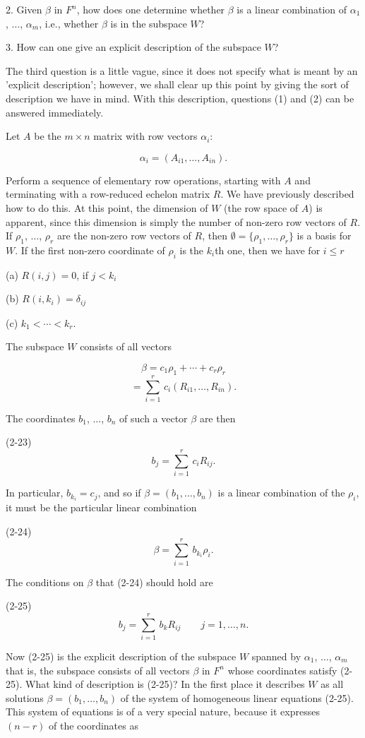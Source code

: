 2. Given \(\beta\) in \(F^{n}\), how does one determine whether \(\beta\) is a linear combination of \(\alpha_{1}\), \(\ldots\), \(\alpha_{m}\), i.e., whether \(\beta\) is in the subspace \(W\)?

3. How can one give an explicit description of the subspace \(W\)?

The third question is a little vague, since it does not specify what is meant by an 'explicit description'; however, we shall clear up this point by giving the sort of description we have in mind. With this description, questions (1) and (2) can be answered immediately.

Let \(A\) be the \(m\times n\) matrix with row vectors \(\alpha_{i}\):

\[\alpha_{i}=(A_{i1},\ldots,A_{in}).\]

Perform a sequence of elementary row operations, starting with \(A\) and terminating with a row-reduced echelon matrix \(R\). We have previously described how to do this. At this point, the dimension of \(W\) (the row space of \(A\)) is apparent, since this dimension is simply the number of non-zero row vectors of \(R\). If \(\rho_{1}\), \(\ldots\), \(\rho_{r}\) are the non-zero row vectors of \(R\), then \(\emptyset=\{\rho_{1},\ldots,\rho_{r}\}\) is a basis for \(W\). If the first non-zero coordinate of \(\rho_{i}\) is the \(k_{i}\)th one, then we have for \(i\leq r\)

(a) \(R(i,j)=0\), if \(j<k_{i}\)

(b) \(R(i,k_{i})=\delta_{ij}\)

(c) \(k_{1}<\cdots<k_{r}\).

The subspace \(W\) consists of all vectors

\[\beta = c_{1}\rho_{1}+\cdots+c_{r}\rho_{r}\] \[= \sum_{i=1}^{r}\,c_{i}(R_{i1},\ldots,R_{in}).\]

The coordinates \(b_{1}\), \(\ldots\), \(b_{n}\) of such a vector \(\beta\) are then

(2-23) \[b_{j}=\sum_{i=1}^{r}\,c_{i}R_{ij}.\]

In particular, \(b_{k_{i}}=c_{j}\), and so if \(\beta=(b_{1},\ldots,b_{n})\) is a linear combination of the \(\rho_{i}\), it must be the particular linear combination

(2-24) \[\beta=\sum_{i=1}^{r}\,b_{k_{i}}\rho_{i}.\]

The conditions on \(\beta\) that (2-24) should hold are

(2-25) \[b_{j}=\sum_{i=1}^{r}\,b_{k}R_{ij}\qquad j=1,\ldots,n.\]

Now (2-25) is the explicit description of the subspace \(W\) spanned by \(\alpha_{1}\), \(\ldots\), \(\alpha_{m}\) that is, the subspace consists of all vectors \(\beta\) in \(F^{n}\) whose coordinates satisfy (2-25). What kind of description is (2-25)? In the first place it describes \(W\) as all solutions \(\beta=(b_{1},\ldots,b_{n})\) of the system of homogeneous linear equations (2-25). This system of equations is of a very special nature, because it expresses \((n-r)\) of the coordinates as 